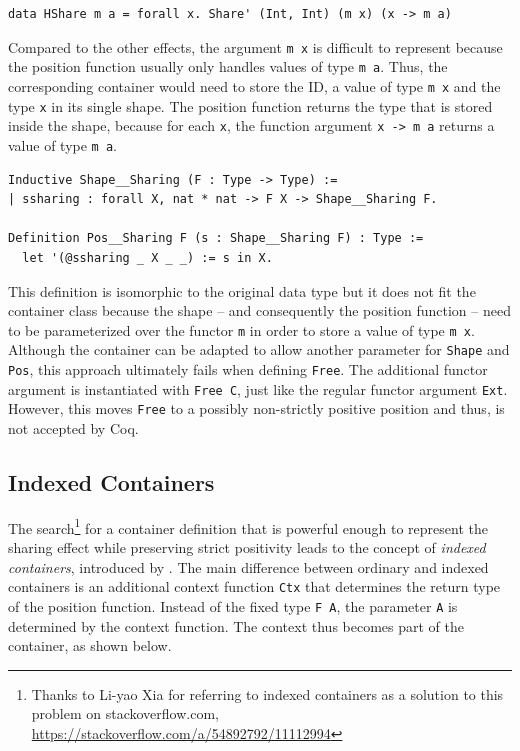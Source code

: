 \documentclass[a4paper, 11pt, fleqn, twoside]{scrreprt}
\newcommand{\hinl}[1]{\texttt{#1}}
\newcommand{\cinl}[1]{\texttt{#1}}
\begin{document}
\begin{verbatim}
data HShare m a = forall x. Share' (Int, Int) (m x) (x -> m a)
\end{verbatim}

Compared to the other effects, the argument \hinl{m x} is difficult to represent because the position function usually only handles values of type \hinl{m a}.
Thus, the corresponding container would need to store the ID, a value of type \hinl{m x} and the type \hinl{x} in its single shape.
The position function returns the type that is stored inside the shape, because for each \hinl{x}, the function argument \hinl{x -> m a} returns a value of type \hinl{m a}.

\begin{verbatim}
Inductive Shape__Sharing (F : Type -> Type) :=
| ssharing : forall X, nat * nat -> F X -> Shape__Sharing F.

Definition Pos__Sharing F (s : Shape__Sharing F) : Type :=
  let '(@ssharing _ X _ _) := s in X.
\end{verbatim}

This definition is isomorphic to the original data type but it does not fit the container class because the shape -- and consequently the position function -- need to be parameterized over the functor \hinl{m} in order to store a value of type \hinl{m x}.
Although the container can be adapted to allow another parameter for \cinl{Shape} and \cinl{Pos}, this approach ultimately fails when defining \cinl{Free}.
The additional functor argument is instantiated with \cinl{Free C}, just like the regular functor argument \cinl{Ext}.
However, this moves \cinl{Free} to a possibly non-strictly positive position and thus, is not accepted by Coq.

\subsection{Indexed Containers}
The search\footnote{Thanks to Li-yao Xia for referring to indexed containers as a solution to this problem on stackoverflow.com, \url{https://stackoverflow.com/a/54892792/11112994}} for a container definition that is powerful enough to represent the sharing effect while preserving strict positivity leads to the concept of \textit{indexed containers}, introduced by \citet{altenkirch2009indexed}. 
The main difference between ordinary and indexed containers is an additional context function \cinl{Ctx} that determines the return type of the position function.
Instead of the fixed type \hinl{F A}, the parameter \cinl{A} is determined by the context function.
The context thus becomes part of the container, as shown below.
\end{document}
